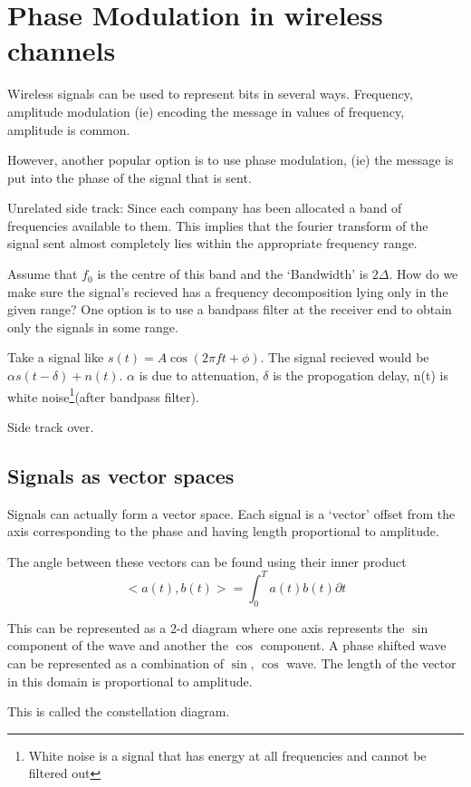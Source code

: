 \documentclass[12pt]{article}
\newcommand{\tbox}[1]{\noindent\fbox{\parbox{\textwidth}{#1}}}
\begin{document}
\section{Phase Modulation in wireless channels}
Wireless signals can be used to represent bits in several ways. 
Frequency, amplitude modulation (ie) encoding the message in values of frequency, amplitude is common. 

However, another popular option is to use phase modulation, (ie) the message is put into the phase of the signal that is sent. 

Unrelated side track:
Since each company has been allocated a band of frequencies available to them. This implies that 
the fourier transform of the signal sent almost completely lies within the appropriate frequency range. 


Assume that \(f_0\) is the centre of this band and the `Bandwidth' is \(2 \Delta\). How do we make sure the 
signal's recieved has a frequency decomposition lying only in the given range? One option is to use a bandpass filter at the receiver end to  
obtain only the signals in some range. 

Take a signal like \(s(t) = A\cos(2\pi ft + \phi)\). The signal recieved would be 
\(\alpha s(t - \delta) + n(t)\). \(\alpha\) is due to attenuation, \(\delta\) is the propogation delay, n(t) is white noise\footnote{White noise is a signal that has energy at all frequencies and cannot be filtered out}(after bandpass filter).

Side track over.
\subsection{Signals as vector spaces}
Signals can actually form a vector space. Each signal is a `vector' offset from 
the axis corresponding to the phase and having length proportional to amplitude.  

The angle between these vectors can be found using their inner product
\[ <a(t),b(t)> = \int_{0}^{T} a(t)b(t) \partial t \]

This can be represented as a 2-d diagram where one axis represents the $\sin$ component of the wave and another the $\cos$ component. 
A phase shifted wave can be represented as a combination of $\sin$, $\cos$ wave. The length of the vector in this domain is proportional to 
amplitude.

This is called the constellation diagram. 

\noindent\tbox{
    \begin{center}
    \textbf{\Huge Lecture 8}
    \end{center}
}
\end{document}
